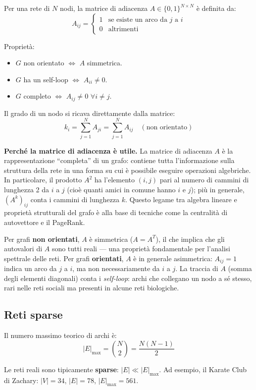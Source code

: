 \documentclass[12pt,a4paper]{article}
\newcommand{\formula}[1]{%
  \begin{equation*}#1\end{equation*}%
}
\begin{document}
Per una rete di $N$ nodi, la matrice di adiacenza $A \in \{0,1\}^{N \times N}$ è definita da:
\[
  A_{ij} = \begin{cases} 1 & \text{se esiste un arco da } j \text{ a } i \\ 0 & \text{altrimenti} \end{cases}
\]

Proprietà:
\begin{itemize}
  \item $G$ non orientato $\Leftrightarrow$ $A$ simmetrica.
  \item $G$ ha un self-loop $\Leftrightarrow$ $A_{ii} \neq 0$.
  \item $G$ completo $\Leftrightarrow$ $A_{ij} \neq 0$ $\forall i \neq j$.
\end{itemize}

Il grado di un nodo si ricava direttamente dalla matrice:
\[
  k_i = \sum_{j=1}^{N} A_{ji} = \sum_{j=1}^{N} A_{ij} \quad (\text{non orientato})
\]

\medskip
\noindent\textbf{Perché la matrice di adiacenza è utile.}
La matrice di adiacenza $A$ è la rappresentazione ``completa'' di un grafo: contiene tutta
l'informazione sulla struttura della rete in una forma su cui è possibile eseguire operazioni
algebriche. In particolare, il prodotto $A^2$ ha l'elemento $(i,j)$ pari al numero di cammini
di lunghezza 2 da $i$ a $j$ (cioè quanti amici in comune hanno $i$ e $j$); più in generale,
$(A^k)_{ij}$ conta i cammini di lunghezza $k$. Questo legame tra algebra lineare e proprietà
strutturali del grafo è alla base di tecniche come la centralità di autovettore e il PageRank.

Per grafi \textbf{non orientati}, $A$ è simmetrica ($A = A^T$), il che implica che gli
autovalori di $A$ sono tutti reali — una proprietà fondamentale per l'analisi spettrale
delle reti. Per grafi \textbf{orientati}, $A$ è in generale asimmetrica: $A_{ij} = 1$
indica un arco da $j$ a $i$, ma non necessariamente da $i$ a $j$. La traccia di $A$ (somma
degli elementi diagonali) conta i \emph{self-loop}: archi che collegano un nodo a sé stesso,
rari nelle reti sociali ma presenti in alcune reti biologiche.

\subsection{Reti sparse}

Il numero massimo teorico di archi è:
\formula{|E|_{\max} = \binom{N}{2} = \frac{N(N-1)}{2}}
Le reti reali sono tipicamente \textbf{sparse}: $|E| \ll |E|_{\max}$.
Ad esempio, il Karate Club di Zachary: $|V|=34$, $|E|=78$, $|E|_{\max}=561$.
\end{document}
